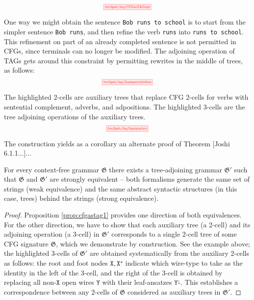 \begin{fullwidth}
\begin{example}
\[\scalebox{0.5}{\tikzfig{tree2gate/tag/CFGasTAGsign}}\]
\end{example}

\begin{example}
One way we might obtain the sentence \texttt{Bob runs to school} is to start from the simpler sentence \texttt{Bob runs}, and then refine the verb \texttt{runs} into \texttt{runs to school}. This refinement on part of an already completed sentence is not permitted in CFGs, since terminals can no longer be modified. The adjoining operation of TAGs gets around this constraint by permitting rewrites in the middle of trees, as follows:
\[\scalebox{0.5}{\tikzfig{tree2gate/tag/3compareintuition}}\]
\end{example}

\begin{example}
The highlighted 2-cells are auxiliary trees that replace CFG 2-cells for verbs with sentential complement, adverbs, and adpositions. The highlighted 3-cells are the tree adjoining operations of the auxiliary trees.
\[\scalebox{0.5}{\tikzfig{tree2gate/tag/tagsignature}}\]
\end{example}

The construction yields as a corollary an alternate proof of Theorem [Joshi 6.1.1...]...

\begin{corollary}
For every context-free grammar $\mathfrak{G}$ there exists a tree-adjoining grammar $\mathfrak{G}'$ such that $\mathfrak{G}$ and $\mathfrak{G}'$ are strongly equivalent -- both formalisms generate the same set of strings (weak equivalence) and the same abstract syntactic structures (in this case, trees) behind the strings (strong equivalence).
\begin{proof}
Proposition \ref{prop:cfgastag1} provides one direction of both equivalences. For the other direction, we have to show that each auxiliary tree (a 2-cell) and its adjoining operation (a 3-cell) in $\mathfrak{G}'$ corresponds to a single 2-cell tree of some CFG signature $\mathfrak{G}$, which we demonstrate by construction. See the example above; the highlighted 3-cells of $\mathfrak{G}'$ are obtained systematically from the auxiliary 2-cells as follows: the root and foot nodes $\texttt{X},\texttt{X}^\star$ indicate which wire-type to take as the identity in the left of the 3-cell, and the right of the 3-cell is obtained by replacing all non-$\texttt{X}$ open wires $\texttt{Y}$ with their leaf-ansatzes $\texttt{Y}^\downarrow$. This establishes a correspondence between any 2-cells of $\mathfrak{G}$ considered as auxiliary trees in $\mathfrak{G}'$.
\end{proof}
\end{corollary}


\end{fullwidth}
